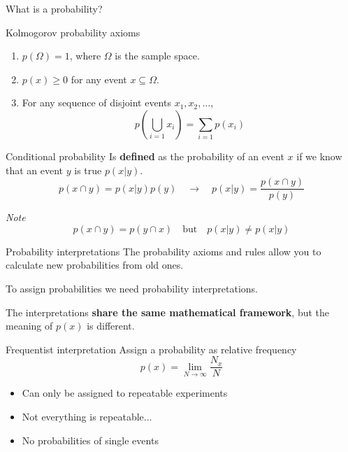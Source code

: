 \documentclass[
aspectratio=169,
14pt,
professionalfonts
]{beamer}
\begin{document}
\begin{frame}
\centering
\Large
What is a probability?
\end{frame}

\begin{frame}{Kolmogorov probability axioms}
\begin{enumerate}
  \item $ p(\Omega) = 1 $, where \( \Omega \) is the sample space.
  \item $ p(x) \geq 0 $ for any event \( x \subseteq \Omega \).
  \item For any sequence of disjoint events \( x_1, x_2, \dots \),
        $$
        p\left( \bigcup_{i=1} x_i \right) = \sum_{i=1} p(x_i)
        $$
\end{enumerate}
\end{frame}


\begin{frame}{Conditional probability}
Is \textbf{defined} as the probability of an event $x$ if we know that an event $y$ is true $p(x|y)$.
$$p(x \cap y) = p(x|y)p(y) \quad \to \quad p(x|y) = \frac{p(x \cap y)}{p(y)}$$

\textit{Note} 
$$p(x \cap y) = p(y \cap x) \quad  \text{but} \quad p(x|y) \neq p(x|y)$$ 
\end{frame}

\begin{frame}{Probability interpretations}
    The probability axioms and rules allow you to calculate new probabilities from old ones.
    
    \vspace{0.5cm}
    To assign probabilities we need probability interpretations.

    \vspace{0.5cm}
    The interpretations \textbf{share the same mathematical framework}, but the meaning of $p(x)$ is different.
\end{frame}

\begin{frame}{Frequentist interpretation}
Assign a probability as relative frequency
$$
p(x) = \lim_{N\to\infty} \frac{N_x}{N}
$$

\begin{itemize}
    \item Can only be assigned to repeatable experiments
    \item Not everything is repeatable...
    \item No probabilities of single events
\end{itemize}
\end{frame}
\end{document}
